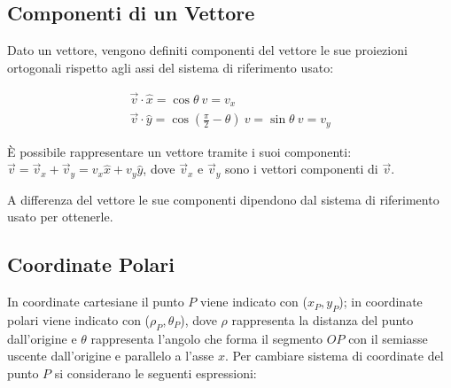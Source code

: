 \documentclass{article}
\numberwithin{equation}{subsection}
\begin{document}
\subsection{Componenti di un Vettore}
Dato un vettore, vengono definiti componenti del vettore le sue proiezioni ortogonali rispetto agli assi del sistema di riferimento usato:

\begin{gather}
    \vec{v}\cdot\hat{x} = \cos\theta\:v = v_x\\
    \vec{v}\cdot\hat{y} = \cos\left(\displaystyle\frac{\pi}{2} - \theta\right)\:v = \sin\theta\:v = v_y
\end{gather}

\`{E} possibile rappresentare un vettore tramite i suoi componenti: $\vec{v} = \vec{v}_x + \vec{v}_y = v_x\hat{x} + v_y\hat{y}$, dove $\vec{v}_x$ e $\vec{v}_y$ sono i vettori componenti di $\vec{v}$.

\begin{center}\end{center}

A differenza del vettore le sue componenti dipendono dal sistema di riferimento usato per ottenerle.

\subsection{Coordinate Polari}
In coordinate cartesiane il punto $P$ viene indicato con ($x_P, y_P$); in coordinate polari viene indicato con ($\rho_P, \theta_P$), dove 
$\rho$ rappresenta la distanza del punto dall'origine e $\theta$ rappresenta l'angolo che forma il segmento $OP$ con il semiasse uscente dall'origine e parallelo a l'asse $x$.
Per cambiare sistema di coordinate del punto $P$ si considerano le seguenti espressioni:  
\end{document}
